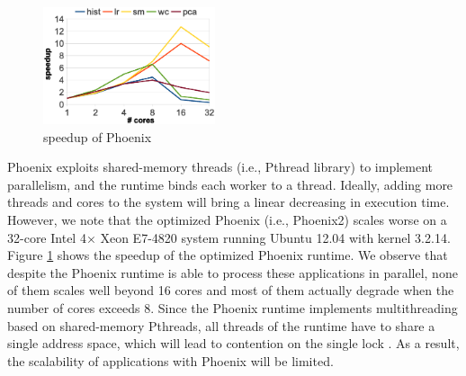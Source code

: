 




\begin{figure}[!h!t]  
	\centering
	\includegraphics[width=0.45\textwidth]{eps/phoenix_speedup.eps}
	\caption{speedup of Phoenix}
	\label{fig:phoenix:speedup}
\end{figure}

Phoenix exploits shared-memory threads (i.e., Pthread library) to implement parallelism, and the runtime binds each worker to a thread.
Ideally, adding more threads and cores to the system will bring a linear decreasing in execution time.
However, we note that the optimized Phoenix \cite{yoo2009phoenix2} (i.e., Phoenix2) scales worse on a 32-core Intel 4× Xeon E7-4820 system running Ubuntu 12.04 with kernel 3.2.14.
Figure \ref{fig:phoenix:speedup} shows the speedup of the optimized Phoenix runtime.
We observe that despite the Phoenix runtime is able to process these applications in parallel, none of them scales well beyond 16 cores and most of them actually degrade when the number of cores exceeds 8.
Since the Phoenix runtime implements multithreading based on shared-memory Pthreads, all threads of the runtime have to share a single address space, which will lead to contention on the single lock \cite{clements2013radixvm}.
As a result, the scalability of applications with Phoenix will be limited. 
 

